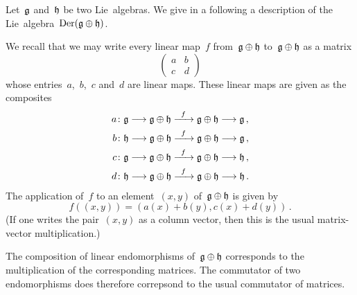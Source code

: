 \begin{example}
	\label{derivations of direct sum}
	Let~$\mathfrak{g}$ and~$\mathfrak{h}$ be two Lie~algebras.
	We give in a following a description of the Lie~algebra~$\operatorname{Der}(\mathfrak{g} \oplus \mathfrak{h})$.

	We recall that we may write every linear map~$f$ from~$\mathfrak{g} \oplus \mathfrak{h}$ to~$\mathfrak{g} \oplus \mathfrak{h}$ as a matrix
	\[
		\begin{pmatrix}
			a & b \\
			c & d
		\end{pmatrix}
	\]
	whose entries~$a$,~$b$,~$c$ and~$d$ are linear maps.
	These linear maps are given as the composites
	\begin{align*}
		a
		&\colon 
		\glie
		\to
		\glie \oplus \hlie
		\xto{f}
		\glie \oplus \hlie
		\to
		\glie \,,
		\\
		b
		&\colon 
		\hlie
		\to
		\glie \oplus \hlie
		\xto{f}
		\glie \oplus \hlie
		\to
		\glie \,,
		\\
		c
		&\colon 
		\glie
		\to
		\glie \oplus \hlie
		\xto{f}
		\glie \oplus \hlie
		\to
		\hlie \,,
		\\
		d
		&\colon 
		\hlie
		\to
		\glie \oplus \hlie
		\xto{f}
		\glie \oplus \hlie
		\to
		\hlie \,.
	\end{align*}
	The application of~$f$ to an element~$(x,y)$ of~$\mathfrak{g} \oplus \mathfrak{h}$ is given by
	\[
		f( (x,y) )
		=
		( a(x) + b(y), c(x) + d(y) ) \,.
	\]
	(If one writes the pair~$(x,y)$ as a column vector, then this is the usual matrix-vector multiplication.)

	The composition of linear endomorphisms of~$\mathfrak{g} \oplus \mathfrak{h}$ corresponds to the multiplication of the corresponding matrices.
	The commutator of two endomorphisms does therefore correpsond to the usual commutator of matrices.


\end{example}
